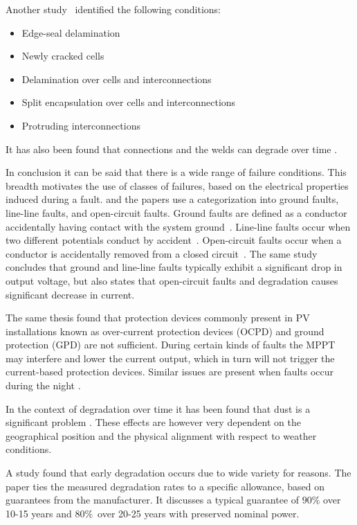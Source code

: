 Another study~\cite{Forman1982} identified the following conditions:
\begin{itemize}
\item Edge-seal delamination
\item Newly cracked cells
\item Delamination over cells and interconnections
\item Split encapsulation over cells and interconnections
\item Protruding interconnections
\end{itemize}

It has also been found that connections and the welds can degrade over time \cite{Houssein2010}.

In conclusion it can be said that there is a wide range of failure conditions.
This breadth motivates the use of classes of failures, based on the electrical properties induced during a fault.
\cite{Zhao2010thesis} and the papers \cite{Zhao2012tree,Zhao2013graph,Zhao2013outlier} use a categorization into ground faults, line-line faults, and open-circuit faults.
Ground faults are defined as a conductor accidentally having contact with the system ground~\cite{Zhao2010thesis}.
Line-line faults occur when two different potentials conduct by accident~\cite{Zhao2010thesis}.
Open-circuit faults occur when a conductor is accidentally removed from a closed circuit~\cite{Zhao2010thesis}.
The same study concludes that ground and line-line faults typically exhibit a significant drop in output voltage,
but also states that open-circuit faults and degradation causes significant decrease in current.

The same thesis found that protection devices commonly present in PV installations known as over-current protection devices (OCPD) and ground protection (GPD) are not sufficient.
During certain kinds of faults the MPPT may interfere and lower the current output, which in turn will not trigger the current-based protection devices.
Similar issues are present when faults occur during the night \cite{Zhao2010night}.

In the context of degradation over time it has been found that dust is a significant problem \cite{Mani2010}.
These effects are however very dependent on the geographical position and the physical alignment with respect to weather conditions.

A study \cite{Munoz2011} found that early degradation occurs due to wide variety for reasons.
The paper ties the measured degradation rates to a specific allowance, based on guarantees from the manufacturer.
It discusses a typical guarantee of $90\%$ over 10-15 years and $80\%$ over 20-25 years with preserved nominal power.

